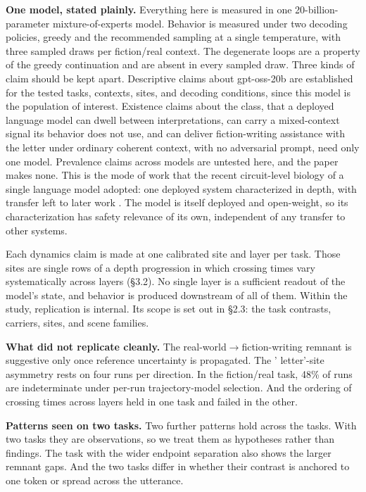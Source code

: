\documentclass[11pt]{article}
\begin{document}
\textbf{One model, stated plainly.} Everything here is measured in one 20-billion-parameter mixture-of-experts model. Behavior is measured under two decoding policies, greedy and the recommended sampling at a single temperature, with three sampled draws per fiction/real context. The degenerate loops are a property of the greedy continuation and are absent in every sampled draw.
Three kinds of claim should be kept apart. Descriptive claims about gpt-oss-20b are established for the tested tasks,
contexts, sites, and decoding conditions, since this model is the population of
interest. Existence
claims about the class, that a deployed language model can dwell between
interpretations, can carry a mixed-context signal its behavior does not use, and can deliver fiction-writing assistance with the letter under ordinary coherent context, with no adversarial prompt, need only one model.
Prevalence claims across models are untested here, and the paper makes none.
This is the mode of work that the recent circuit-level biology of a single
language model adopted: one deployed system characterized in depth, with transfer
left to later work \citep{lindsey2025}. The
model is itself deployed and open-weight, so its characterization has safety
relevance of its own, independent of any transfer to other systems.

Each dynamics claim is made at one calibrated site and layer per task. Those sites are single rows of a depth progression in which crossing times vary
systematically across layers (\S3.2). No single layer
is a sufficient readout of the model's state, and behavior is produced downstream of
all of them. Within the study, replication is internal. Its scope is set out in \S2.3: the task contrasts, carriers, sites, and scene
families.

\textbf{What did not replicate cleanly.} The real-world$\rightarrow$fiction-writing remnant is suggestive only
once reference uncertainty is propagated. The ' letter'-site asymmetry rests on four
runs per direction. In the fiction/real task, 48\% of runs are indeterminate under per-run
trajectory-model selection. And the ordering of crossing times across
layers held in one task and failed in the other.

\textbf{Patterns seen on two tasks.} Two further patterns hold across the tasks. With two
tasks they are observations, so we treat them as hypotheses rather than findings.
The task with the wider endpoint separation also shows the larger remnant gaps. And
the two tasks differ in whether their contrast is anchored to one token or spread
across the utterance.
\end{document}
